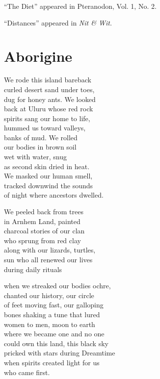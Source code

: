 \documentclass[twoside,10pt]{book}
\begin{document}
``The Diet'' appeared in Pteranodon, Vol. 1, No. 2.

``Distances'' appeared in \emph{Nit \& Wit.}

\textbf{\hfill\break
}



\cleardoublepage
\tableofcontents


\mainmatter
\cleardoublepage

\section{Aborigine}

We rode this island bareback\\
curled desert sand under toes,\\
dug for honey ants. We looked\\
back at Uluru whose red rock\\
spirits sang our home to life,\\
hummed us toward valleys,\\
banks of mud. We rolled\\
our bodies in brown soil\\
wet with water, snug\\
as second skin dried in heat.\\
We masked our human smell,\\
tracked downwind the sounds\\
of night where ancestors dwelled.

We peeled back from trees\\
in Arnhem Land, painted\\
charcoal stories of our clan\\
who sprung from red clay\\
along with our lizards, turtles,\\
sun who all renewed our lives\\
during daily rituals

when we streaked our bodies ochre,\\
chanted our history, our circle\\
of feet moving fast, our galloping\\
bones shaking a tune that lured\\
women to men, moon to earth\\
where we became one and no one\\
could own this land, this black sky\\
pricked with stars during Dreamtime\\
when spirits created light for us\\
who came first.
\end{document}
